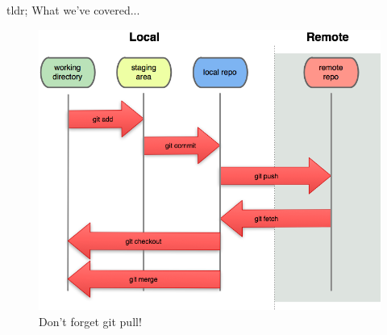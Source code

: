 \begin{frame}{tldr; What we've covered...}
    \begin{figure}[ht]
        \centering
        \includegraphics[width=0.8\linewidth]{img/overview.png}
        \caption{Don't forget git pull!}
        \label{fig:figure10}
    \end{figure}
\end{frame}
